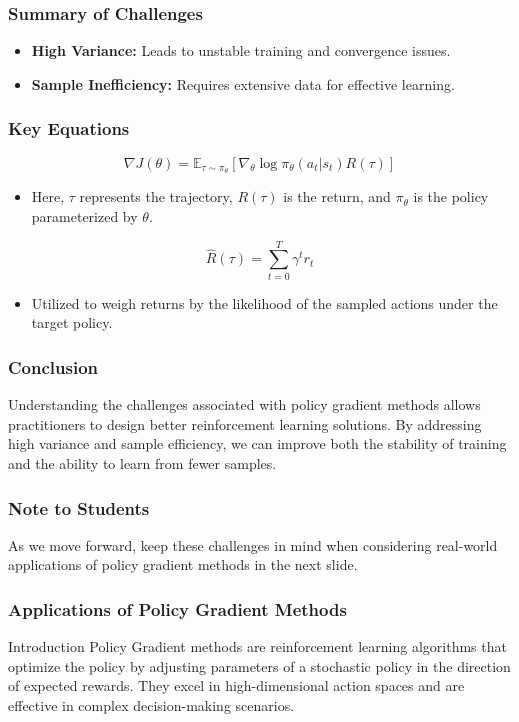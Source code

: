 \documentclass[aspectratio=169]{beamer}
\begin{document}
\begin{frame}[fragile]
    \frametitle{Summary of Challenges}
    \begin{itemize}
        \item \textbf{High Variance:} Leads to unstable training and convergence issues.
        \item \textbf{Sample Inefficiency:} Requires extensive data for effective learning.
    \end{itemize}
\end{frame}

\begin{frame}[fragile]
    \frametitle{Key Equations}
    \begin{equation}
        \nabla J(\theta) = \mathbb{E}_{\tau \sim \pi_\theta} \left[ \nabla_{\theta} \log \pi_\theta(a_t | s_t) R(\tau) \right]
    \end{equation}
    \begin{itemize}
        \item Here, $ \tau $ represents the trajectory, $ R(\tau) $ is the return, and $ \pi_\theta $ is the policy parameterized by $ \theta $.
    \end{itemize}
    
    \begin{equation}
        \hat{R}(\tau) = \sum_{t=0}^{T} \gamma^t r_t
    \end{equation}
    \begin{itemize}
        \item Utilized to weigh returns by the likelihood of the sampled actions under the target policy.
    \end{itemize}
\end{frame}

\begin{frame}[fragile]
    \frametitle{Conclusion}
    Understanding the challenges associated with policy gradient methods allows practitioners to design better reinforcement learning solutions. By addressing high variance and sample efficiency, we can improve both the stability of training and the ability to learn from fewer samples.
\end{frame}

\begin{frame}[fragile]
    \frametitle{Note to Students}
    As we move forward, keep these challenges in mind when considering real-world applications of policy gradient methods in the next slide.
\end{frame}

\begin{frame}[fragile]
    \frametitle{Applications of Policy Gradient Methods}
    \begin{block}{Introduction}
        Policy Gradient methods are reinforcement learning algorithms that optimize the policy by adjusting parameters of a stochastic policy in the direction of expected rewards. They excel in high-dimensional action spaces and are effective in complex decision-making scenarios.
    \end{block}
\end{frame}
\end{document}

